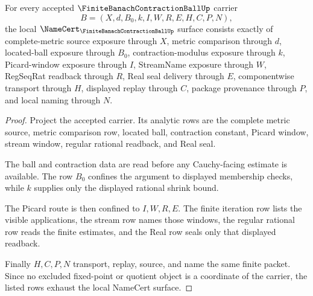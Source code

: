 \begin{theorem}
\label{thm:finite-banach-contraction-ball-namecert-obligations}
For every accepted $\FiniteBanachContractionBallUp$ carrier
$$
B=(X,d,B_0,k,I,W,R,E,H,C,P,N),
$$
the local $\NameCert_{\FiniteBanachContractionBallUp}$ surface consists exactly of complete-metric source exposure through $X$, metric comparison through $d$, located-ball exposure through $B_0$, contraction-modulus exposure through $k$, Picard-window exposure through $I$, StreamName exposure through $W$, RegSeqRat readback through $R$, Real seal delivery through $E$, componentwise transport through $H$, displayed replay through $C$, package provenance through $P$, and local naming through $N$.
\end{theorem}
\begin{proof}
Project the accepted carrier. Its analytic rows are the complete metric source, metric comparison row, located ball, contraction constant, Picard window, stream window, regular rational readback, and Real seal.

The ball and contraction data are read before any Cauchy-facing estimate is available. The row $B_0$ confines the argument to displayed membership checks, while $k$ supplies only the displayed rational shrink bound.

The Picard route is then confined to $I,W,R,E$. The finite iteration row lists the visible applications, the stream row names those windows, the regular rational row reads the finite estimates, and the Real row seals only that displayed readback.

Finally $H,C,P,N$ transport, replay, source, and name the same finite packet. Since no excluded fixed-point or quotient object is a coordinate of the carrier, the listed rows exhaust the local NameCert surface.
\end{proof}

